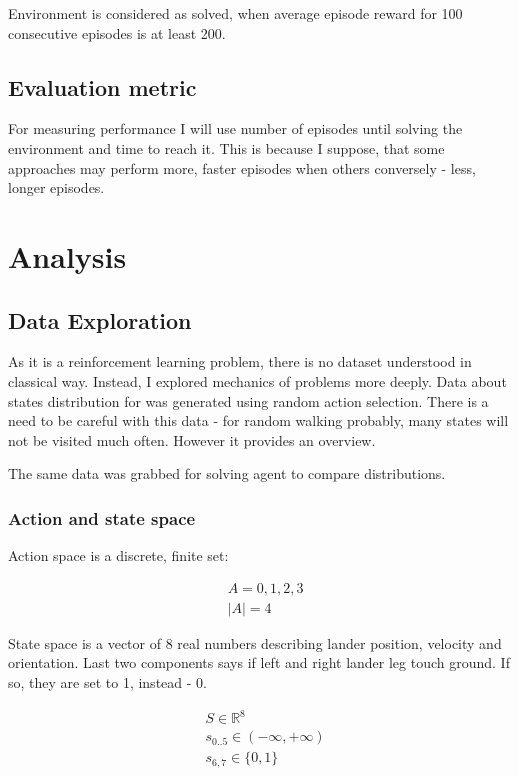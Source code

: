 \documentclass[12pt]{article}
\begin{document}
Environment is considered as solved, when average episode reward for 100 consecutive episodes is at least 200.

\subsection{Evaluation metric}

For measuring performance I will use number of episodes until solving the environment and time to reach it. This is because I suppose, that some approaches may perform more, faster episodes when others conversely - less, longer episodes.

\section{Analysis}
\subsection{Data Exploration}

As it is a reinforcement learning problem, there is no dataset understood in classical way. Instead, I explored mechanics of problems more deeply. Data about states distribution for was generated using random action selection. There is a need to be careful with this data - for random walking probably, many states will not be visited much often. However it provides an overview.

The same data was grabbed for solving agent to compare distributions.

\subsubsection{Action and state space}

Action space is a discrete, finite set:

\begin{equation}
\begin{aligned}
&A = {0,1,2,3} \\
&|A| = 4
\end{aligned}
\end{equation}

State space is a vector of 8 real numbers describing lander position, velocity and orientation. Last two components says if left and right lander leg touch ground. If so, they are set to 1, instead - 0.

\begin{equation}
\begin{aligned}
&S \in \mathbb{R}^8 \\
&s_{0..5} \in (-\infty, +\infty) \\
&s_{6,7} \in \{0,1\} \\
\end{aligned}
\end{equation}
\end{document}
